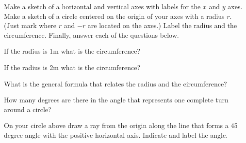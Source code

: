 
\begin{problem}
\item Make a sketch of a horizontal and vertical axes with labels for
  the $x$ and $y$ axes. Make a sketch of a circle centered on the
  origin of your axes with a radius $r$. (Just mark where $r$ and $-r$
  are located on the axes.)  Label the radius and the
  circumference. Finally, answer each of the questions below.

  \vfill

  \begin{subproblem}
  \item If the radius is 1m what is the circumference?
    \vspace{4em}
  \item If the radius is 2m what is the circumference?
    \vspace{4em}
  \item What is the general formula that relates the radius and the circumference?
    \vspace{4em}
  \item How many degrees are there in the angle that represents one
    complete turn around a circle?
    \vspace{4em}
  \item On your circle above draw a ray from the origin along the line
    that forms a 45 degree angle with the positive horizontal
    axis. Indicate and label the angle.
  \end{subproblem}
\end{problem}



